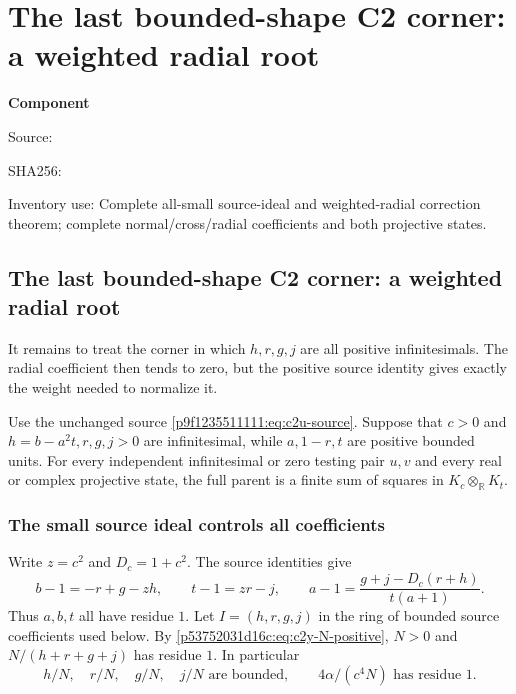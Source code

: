 \chapter{The last bounded-shape C2 corner: a weighted radial root}
\label{component:p163e0ebf59f6}
\noindent\textbf{Component }\par
{\small\noindent Source: \par}
{\small\noindent SHA256: \par}
{\small\noindent Inventory use: Complete all-small source-ideal and weighted-radial correction theorem; complete normal/cross/radial coefficients and both projective states.\par}
\medskip
\section{The last bounded-shape C2 corner: a weighted radial root}
\label{p163e0ebf59f6:sec:c2-radial-corner}

It remains to treat the corner in which $h,r,g,j$ are all positive
infinitesimals.  The radial coefficient then tends to zero, but the
positive source identity gives exactly the weight needed to normalize it.

\begin{theorem}
\label{p163e0ebf59f6:thm:c2-radial-corner}
Use the unchanged source \eqref{p9f1235511111:eq:c2u-source}.  Suppose that $c>0$ and
$h=b-a^2t,r,g,j>0$ are infinitesimal, while $a,1-r,t$ are positive
bounded units.  For every independent infinitesimal or zero testing pair
$u,v$ and every real or complex projective state, the full parent is a
finite sum of squares in $K_c\otimes_{\mathbb R}K_t$.
\end{theorem}

\subsection{The small source ideal controls all coefficients}
Write $z=c^2$ and $D_c=1+c^2$.  The source identities give
\begin{equation}
b-1=-r+g-zh,\qquad t-1=zr-j,\qquad
a-1=\frac{g+j-D_c(r+h)}{t(a+1)}.
\label{p163e0ebf59f6:eq:c2r-source-ideal}
\end{equation}
Thus $a,b,t$ all have residue $1$.  Let $I=(h,r,g,j)$ in the ring of
bounded source coefficients used below.  By
\eqref{p53752031d16c:eq:c2y-N-positive}, $N>0$ and $N/(h+r+g+j)$ has residue $1$.
In particular
\begin{equation}
h/N,\quad r/N,\quad g/N,\quad j/N
\text{ are bounded},\qquad
4\alpha/(c^4N)\text{ has residue }1.
\label{p163e0ebf59f6:eq:c2r-weight-bounds}
\end{equation}

